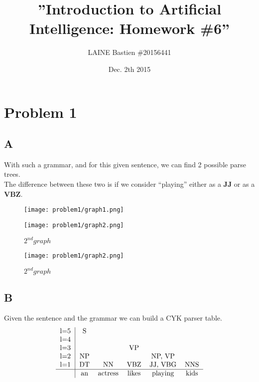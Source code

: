 \documentclass{article}
\begin{document}
\title{\textbf{''Introduction to Artificial Intelligence: Homework \#6''}}
\author{LAINE Bastien \#20156441}
\date{Dec. 2th 2015}
\maketitle
\tableofcontents

\newpage
    \section{Problem 1}
        \subsection{A}
            With such a grammar, and for this given sentence, we can find 2 possible parse trees.\\
            The difference between these two is if we consider ``playing'' either as a \textbf{JJ} or as a \textbf{VBZ}.
            \begin{figure}[H]
                \centering
                \texttt{[image: problem1/graph1.png]}
                \caption{$1^{st} graph$}
                \texttt{[image: problem1/graph2.png]}
                \caption{$2^{nd} graph$}
            \end{figure}
            \begin{figure}[H]
                \centering
                \texttt{[image: problem1/graph2.png]}
                \caption{$2^{nd} graph$}
            \end{figure}
        \subsection{B}
            Given the sentence and the grammar we can build a CYK parser table.
            \[
                \begin{tabular}{r|ccccccccc}
                    l=5 & S\\
                    l=4 &  &\\
                    l=3 &  &  & VP\\
                    l=2 & NP &  &  & NP, VP\\
                    l=1 & DT & NN & VBZ & JJ, VBG & NNS \\
                    \hline
                    & an & actress & likes & playing & kids \\
                \end{tabular}
            \]
    \newpage
\end{document}
